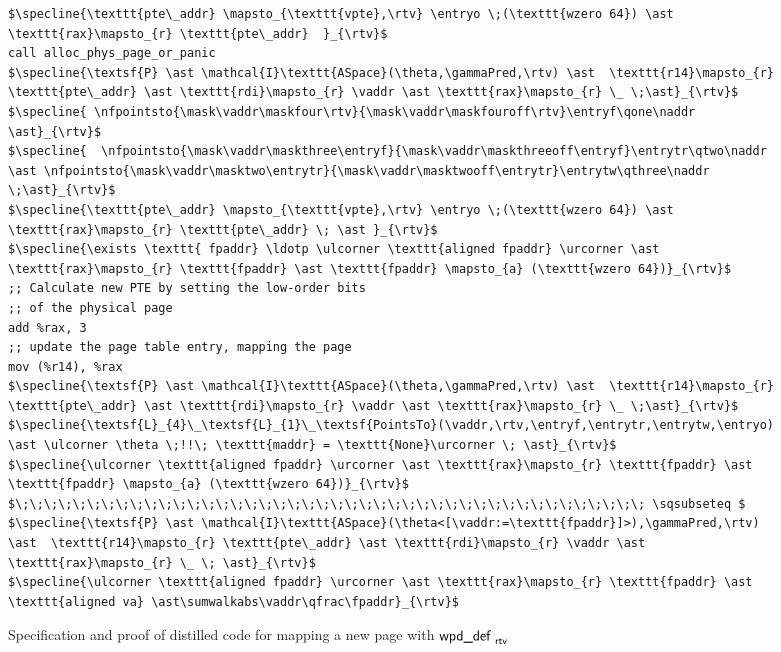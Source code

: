 \begin{figure}
\begin{lstlisting}
$\specline{\texttt{pte\_addr} \mapsto_{\texttt{vpte},\rtv} \entryo \;(\texttt{wzero 64}) \ast \texttt{rax}\mapsto_{r} \texttt{pte\_addr}  }_{\rtv}$
call alloc_phys_page_or_panic
$\specline{\textsf{P} \ast \mathcal{I}\texttt{ASpace}(\theta,\gammaPred,\rtv) \ast  \texttt{r14}\mapsto_{r} \texttt{pte\_addr} \ast \texttt{rdi}\mapsto_{r} \vaddr \ast \texttt{rax}\mapsto_{r} \_ \;\ast}_{\rtv}$
$\specline{ \nfpointsto{\mask\vaddr\maskfour\rtv}{\mask\vaddr\maskfouroff\rtv}\entryf\qone\naddr \ast}_{\rtv}$ 
$\specline{  \nfpointsto{\mask\vaddr\maskthree\entryf}{\mask\vaddr\maskthreeoff\entryf}\entrytr\qtwo\naddr \ast \nfpointsto{\mask\vaddr\masktwo\entrytr}{\mask\vaddr\masktwooff\entrytr}\entrytw\qthree\naddr \;\ast}_{\rtv}$
$\specline{\texttt{pte\_addr} \mapsto_{\texttt{vpte},\rtv} \entryo \;(\texttt{wzero 64}) \ast \texttt{rax}\mapsto_{r} \texttt{pte\_addr} \; \ast }_{\rtv}$
$\specline{\exists \texttt{ fpaddr} \ldotp \ulcorner \texttt{aligned fpaddr} \urcorner \ast \texttt{rax}\mapsto_{r} \texttt{fpaddr} \ast \texttt{fpaddr} \mapsto_{a} (\texttt{wzero 64})}_{\rtv}$
;; Calculate new PTE by setting the low-order bits
;; of the physical page
add %rax, 3
;; update the page table entry, mapping the page
mov (%r14), %rax
$\specline{\textsf{P} \ast \mathcal{I}\texttt{ASpace}(\theta,\gammaPred,\rtv) \ast  \texttt{r14}\mapsto_{r} \texttt{pte\_addr} \ast \texttt{rdi}\mapsto_{r} \vaddr \ast \texttt{rax}\mapsto_{r} \_ \;\ast}_{\rtv}$
$\specline{\textsf{L}_{4}\_\textsf{L}_{1}\_\textsf{PointsTo}(\vaddr,\rtv,\entryf,\entrytr,\entrytw,\entryo) \ast \ulcorner \theta \;!!\; \texttt{maddr} = \texttt{None}\urcorner \; \ast}_{\rtv}$
$\specline{\ulcorner \texttt{aligned fpaddr} \urcorner \ast \texttt{rax}\mapsto_{r} \texttt{fpaddr} \ast \texttt{fpaddr} \mapsto_{a} (\texttt{wzero 64})}_{\rtv}$
$\;\;\;\;\;\;\;\;\;\;\;\;\;\;\;\;\;\;\;\;\;\;\;\;\;\;\;\;\;\;\;\;\;\;\;\;\;\;\;\;\;\;\;\; \sqsubseteq $
$\specline{\textsf{P} \ast \mathcal{I}\texttt{ASpace}(\theta<[\vaddr:=\texttt{fpaddr}]>),\gammaPred,\rtv) \ast  \texttt{r14}\mapsto_{r} \texttt{pte\_addr} \ast \texttt{rdi}\mapsto_{r} \vaddr \ast \texttt{rax}\mapsto_{r} \_ \; \ast}_{\rtv}$
$\specline{\ulcorner \texttt{aligned fpaddr} \urcorner \ast \texttt{rax}\mapsto_{r} \texttt{fpaddr} \ast \texttt{aligned va} \ast\sumwalkabs\vaddr\qfrac\fpaddr}_{\rtv}$
\end{lstlisting}
  \caption{Specification and proof of distilled code for mapping a new page with $\textsf{wpd\_def }_{\textsf{rtv}}$}
\label{fig:mapping_code}
\end{figure}

